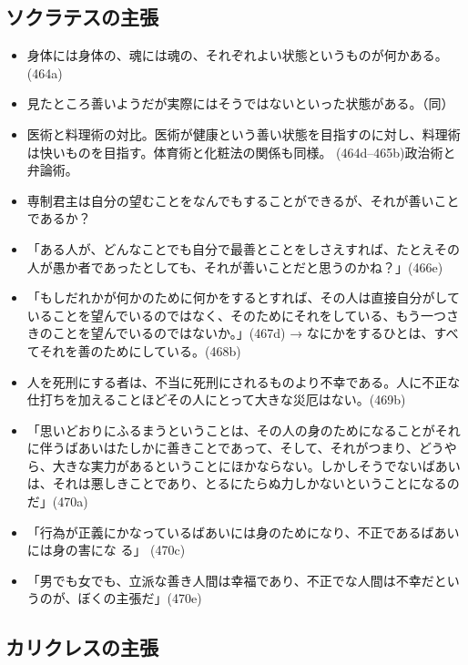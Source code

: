 \documentclass[dvipdfmx]{jsarticle}
\begin{document}
\subsection{ソクラテスの主張}
\begin{itemize}
\item 身体には身体の、魂には魂の、それぞれよい状態というものが何かある。(464a)

\item   見たところ善いようだが実際にはそうではないといった状態がある。（同）

\item 医術と料理術の対比。医術が健康という善い状態を目指すのに対し、料理術は快いものを目指す。体育術と化粧法の関係も同様。 (464d--465b)政治術と弁論術。

\item   専制君主は自分の望むことをなんでもすることができるが、それが善いことであるか？

\item 「ある人が、どんなことでも自分で最善とことをしさえすれば、たとえその人が愚か者であったとしても、それが善いことだと思うのかね？」(466e)

\item 「もしだれかが何かのために何かをするとすれば、その人は直接自分がしていることを望んでいるのではなく、そのためにそれをしている、もう一つさきのことを望んでいるのではないか。」(467d) → なにかをするひとは、すべてそれを善のためにしている。(468b)

\item 人を死刑にする者は、不当に死刑にされるものより不幸である。人に不正な仕打ちを加えることほどその人にとって大きな災厄はない。(469b)

\item 「思いどおりにふるまうということは、その人の身のためになることがそれに伴うばあいはたしかに善きことであって、そして、それがつまり、どうやら、大きな実力があるということにほかならない。しかしそうでないばあいは、それは悪しきことであり、とるにたらぬ力しかないということになるのだ」(470a)

\item   「行為が正義にかなっているばあいには身のためになり、不正であるばあいには身の害にな
  る」 (470c)

\item 「男でも女でも、立派な善き人間は幸福であり、不正でな人間は不幸だというのが、ぼくの主張だ」(470e)
\end{itemize}


\subsection{カリクレスの主張}
\end{document}
